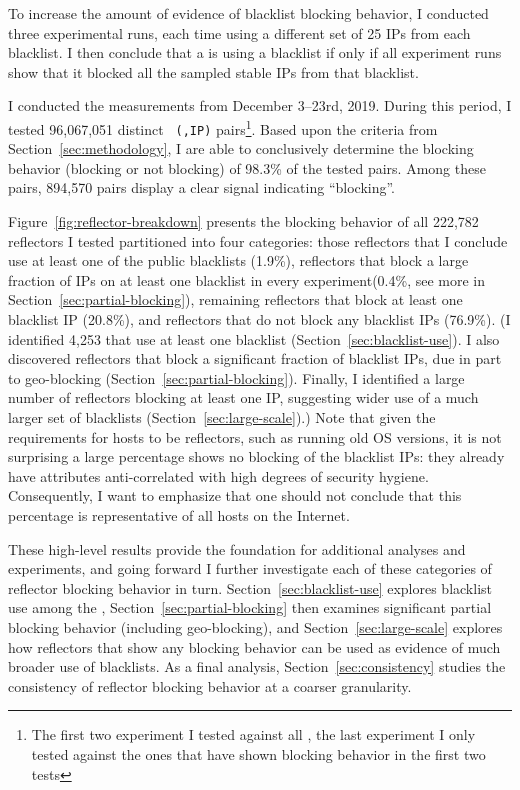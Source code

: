 To increase the amount of evidence of blacklist blocking behavior, I
conducted three experimental runs, each time using a different set of 25
IPs from each blacklist. I then conclude that a {} is using a 
blacklist if only if all experiment runs show that it blocked all the 
sampled stable IPs from that blacklist.

I conducted the measurements from December 3--23rd, 2019.  During
this period, I tested 96,067,051 distinct \texttt{\small
  ({},IP)} pairs\footnote{The first two experiment I tested against
  all {}, the last experiment I only tested against the ones that
  have shown blocking behavior in the first two tests}.
Based upon the criteria from
Section~\ref{sec:methodology}, I are able to conclusively determine
the blocking behavior (blocking or not blocking) of 98.3\% of the
tested pairs.  Among these pairs, 894,570 pairs display a
clear signal indicating ``blocking''.

Figure~\ref{fig:reflector-breakdown} presents the blocking behavior of
all 222,782 reflectors I tested partitioned into four categories:
those reflectors that I conclude use at least one of the public
blacklists (1.9\%), reflectors that block a large fraction of IPs on
at least one blacklist in every experiment(0.4\%, see more in
Section~\ref{sec:partial-blocking}), remaining reflectors that block at
least one blacklist IP (20.8\%), and reflectors that do not block any
blacklist IPs (76.9\%). (I identified 4,253 {} that use at
  least one blacklist (Section~\ref{sec:blacklist-use}).  I also
  discovered reflectors that block a significant fraction of blacklist
  IPs, due in part to geo-blocking
  (Section~\ref{sec:partial-blocking}).  Finally, I identified a
  large number of reflectors blocking at least one IP, suggesting
  wider use of a much larger set of blacklists
  (Section~\ref{sec:large-scale}).) Note that given the requirements for hosts to
be reflectors, such as running old OS versions, it is not surprising a
large percentage shows no blocking of the blacklist IPs: they already
have attributes anti-correlated with high degrees of security hygiene.
Consequently, I want to emphasize that one should not conclude that
this percentage is representative of all hosts on the Internet.

These high-level results provide the foundation for additional
analyses and experiments, and going forward I further investigate
each of these categories of reflector blocking behavior in turn.
Section~\ref{sec:blacklist-use} explores blacklist use among the
{}, Section~\ref{sec:partial-blocking} then examines
significant partial blocking behavior (including geo-blocking), and
Section~\ref{sec:large-scale} explores how reflectors that show any
blocking behavior can be used as evidence of much broader use of
blacklists.  As a final analysis, Section~\ref{sec:consistency}
studies the consistency of reflector blocking behavior at a coarser
granularity.

